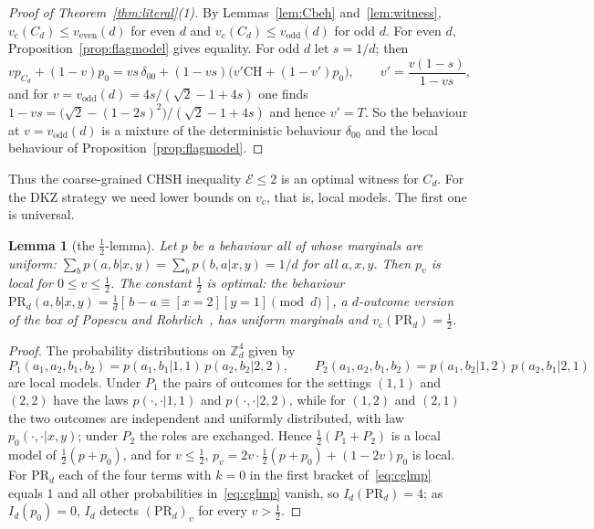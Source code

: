 \documentclass[11pt]{amsart}
\newtheorem{lemma}[theorem]{Lemma}
\theoremstyle{definition}
\theoremstyle{remark}
\numberwithin{equation}{section}
\newcommand{\Z}{\mathbb{Z}}
\newcommand{\vc}{v_{\mathrm c}}
\newcommand{\veven}{v_{\mathrm{even}}}
\newcommand{\vodd}{v_{\mathrm{odd}}}
\newcommand{\CH}{\mathrm{CH}}
\begin{document}
\begin{proof}[Proof of Theorem~\ref{thm:literal}(1)]
By Lemmas~\ref{lem:Cbeh} and~\ref{lem:witness}, $\vc(C_d)\le\veven(d)$ for even $d$ and $\vc(C_d)\le\vodd(d)$ for odd
$d$. For even $d$, Proposition~\ref{prop:flagmodel} gives equality. For odd $d$ let $s=1/d$; then
\[
vp_{C_d}+(1-v)p_0=vs\,\delta_{00}+(1-vs)\bigl(v'\CH+(1-v')p_0\bigr),\qquad v'=\frac{v(1-s)}{1-vs},
\]
and for $v=\vodd(d)=4s/(\sqrt2-1+4s)$ one finds $1-vs=\bigl(\sqrt2-(1-2s)^2\bigr)/(\sqrt2-1+4s)$ and hence $v'=T$. So
the behaviour at $v=\vodd(d)$ is a mixture of the deterministic behaviour $\delta_{00}$ and the local behaviour of
Proposition~\ref{prop:flagmodel}.
\end{proof}

Thus the coarse-grained CHSH inequality $\mathcal E\le2$ is an optimal witness for $C_d$. For the DKZ strategy we need
lower bounds on $\vc$, that is, local models. The first one is universal.

\begin{lemma}[the $\frac12$-lemma]\label{lem:half}
Let $p$ be a behaviour all of whose marginals are uniform: $\sum_bp(a,b|x,y)=\sum_bp(b,a|x,y)=1/d$ for all $a,x,y$.
Then $p_v$ is local for $0\le v\le\frac12$. The constant $\frac12$ is optimal: the behaviour
$\mathrm{PR}_d(a,b|x,y)=\frac1d[\,b-a\equiv[x=2][y=1]\pmod d\,]$, a $d$-outcome version of the box of Popescu and
Rohrlich~\cite{PR}, has uniform marginals and $\vc(\mathrm{PR}_d)=\frac12$.
\end{lemma}

\begin{proof}
The probability distributions on $\Z_d^4$ given by
\[
P_1(a_1,a_2,b_1,b_2)=p(a_1,b_1|1,1)\,p(a_2,b_2|2,2),\qquad P_2(a_1,a_2,b_1,b_2)=p(a_1,b_2|1,2)\,p(a_2,b_1|2,1)
\]
are local models. Under $P_1$ the pairs of outcomes
for the settings $(1,1)$ and $(2,2)$ have the laws $p(\cdot,\cdot|1,1)$ and $p(\cdot,\cdot|2,2)$, while for $(1,2)$
and $(2,1)$ the two outcomes are independent and uniformly distributed, with law $p_0(\cdot,\cdot|x,y)$; under $P_2$ the
roles are exchanged. Hence $\frac12(P_1+P_2)$ is a local model of $\frac12(p+p_0)$, and for $v\le\frac12$,
$p_v=2v\cdot\frac12(p+p_0)+(1-2v)p_0$ is local. For $\mathrm{PR}_d$ each of the four terms with $k=0$ in the first
bracket of~\eqref{eq:cglmp} equals $1$ and all other probabilities in~\eqref{eq:cglmp} vanish, so
$I_d(\mathrm{PR}_d)=4$; as $I_d(p_0)=0$, $I_d$ detects $(\mathrm{PR}_d)_v$ for every $v>\frac12$.
\end{proof}
\end{document}
